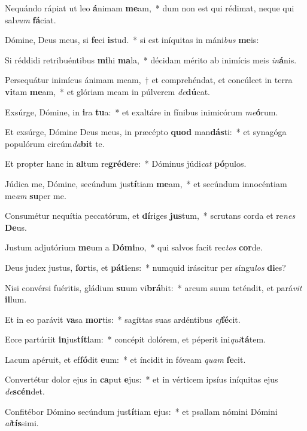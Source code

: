 \item Nequándo rápiat ut leo \textbf{á}nimam \textbf{me}am,~* dum non est qui rédimat, neque qui sal\textit{vum} \textbf{fá}ciat.
\item Dómine, Deus meus, si \textbf{fe}ci \textbf{is}tud.~* si est iníquitas in máni\textit{bus} \textbf{me}is:
\item Si réddidi retribuéntibus \textbf{mi}hi \textbf{ma}la,~* décidam mérito ab inimícis meis \textit{in}\textbf{á}nis.
\item Persequátur inimícus ánimam meam,~† et comprehéndat, et concúlcet in terra \textbf{vi}tam \textbf{me}am,~* et glóriam meam in púlverem \textit{de}\textbf{dú}cat.
\item Exsúrge, Dómine, in \textbf{i}ra \textbf{tu}a:~* et exaltáre in fínibus inimicórum \textit{me}\textbf{ó}rum.
\item Et exsúrge, Dómine Deus meus, in præcépto \textbf{quod} man\textbf{dás}ti:~* et synagóga populórum circúm\textit{da}\textbf{bit} te.
\item Et propter hanc in \textbf{al}tum re\textbf{gré}\textbf{de}re:~* Dóminus júdi\textit{cat} \textbf{pó}pulos.
\item Júdica me, Dómine, secúndum jus\textbf{tí}tiam \textbf{me}am,~* et secúndum innocéntiam me\textit{am} \textbf{su}per me.
\item Consumétur nequítia peccatórum, et \textbf{dí}riges \textbf{jus}tum,~* scrutans corda et re\textit{nes} \textbf{De}us.
\item Justum adjutórium \textbf{me}um a \textbf{Dó}\textbf{mi}no,~* qui salvos facit rec\textit{tos} \textbf{cor}de.
\item Deus judex justus, \textbf{for}tis, et \textbf{pá}\textbf{ti}ens:~* numquid iráscitur per síngu\textit{los} \textbf{di}es?
\item Nisi convérsi fuéritis, gládium \textbf{su}um vi\textbf{brá}bit:~* arcum suum teténdit, et pará\textit{vit} \textbf{il}lum.
\item Et in eo parávit \textbf{va}sa \textbf{mor}tis:~* sagíttas suas ardéntibus \textit{ef}\textbf{fé}cit.
\item Ecce partúriit \textbf{in}jus\textbf{tí}\textbf{ti}am:~* concépit dolórem, et péperit ini\textit{qui}\textbf{tá}tem.
\item Lacum apéruit, et ef\textbf{fó}dit \textbf{e}um:~* et íncidit in fóveam \textit{quam} \textbf{fe}cit.
\item Convertétur dolor ejus in \textbf{ca}put \textbf{e}jus:~* et in vérticem ipsíus iníquitas ejus \textit{de}\textbf{scén}det.
\item Confitébor Dómino secúndum jus\textbf{tí}tiam \textbf{e}jus:~* et psallam nómini Dómini \textit{al}\textbf{tís}simi.
